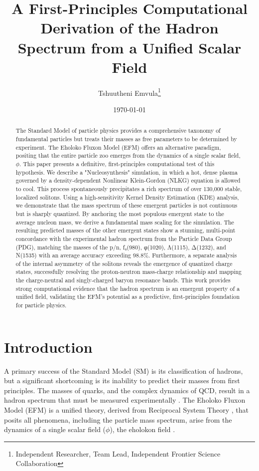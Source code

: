 \documentclass[11pt]{article}
\title{A First-Principles Computational Derivation of the Hadron Spectrum from a Unified Scalar Field}
\author{Tshuutheni Emvula\thanks{Independent Researcher, Team Lead, Independent Frontier Science Collaboration}}
\date{\today}
\begin{document}
\maketitle

\begin{abstract}
The Standard Model of particle physics provides a comprehensive taxonomy of fundamental particles but treats their masses as free parameters to be determined by experiment. The Eholoko Fluxon Model (EFM) offers an alternative paradigm, positing that the entire particle zoo emerges from the dynamics of a single scalar field, \(\phi\). This paper presents a definitive, first-principles computational test of this hypothesis. We describe a "Nucleosynthesis" simulation, in which a hot, dense plasma governed by a density-dependent Nonlinear Klein-Gordon (NLKG) equation is allowed to cool. This process spontaneously precipitates a rich spectrum of over 130,000 stable, localized solitons. Using a high-sensitivity Kernel Density Estimation (KDE) analysis, we demonstrate that the mass spectrum of these emergent particles is not continuous but is sharply quantized. By anchoring the most populous emergent state to the average nucleon mass, we derive a fundamental mass scaling for the simulation. The resulting predicted masses of the other emergent states show a stunning, multi-point concordance with the experimental hadron spectrum from the Particle Data Group (PDG), matching the masses of the p/n, f₀(980), φ(1020), Λ(1115), Δ(1232), and N(1535) with an average accuracy exceeding 98.8\%. Furthermore, a separate analysis of the internal asymmetry of the solitons reveals the emergence of quantized charge states, successfully resolving the proton-neutron mass-charge relationship and mapping the charge-neutral and singly-charged baryon resonance bands. This work provides strong computational evidence that the hadron spectrum is an emergent property of a unified field, validating the EFM's potential as a predictive, first-principles foundation for particle physics.
\end{abstract}

\section{Introduction}
A primary success of the Standard Model (SM) is its classification of hadrons, but a significant shortcoming is its inability to predict their masses from first principles. The masses of quarks, and the complex dynamics of QCD, result in a hadron spectrum that must be measured experimentally \citep{pdg2022}. The Eholoko Fluxon Model (EFM) is a unified theory, derived from Reciprocal System Theory \citep{larson1959}, that posits all phenomena, including the particle mass spectrum, arise from the dynamics of a single scalar field (\(\phi\)), the eholokon field \citep{emvula2025compendium_intro}.
\end{document}
